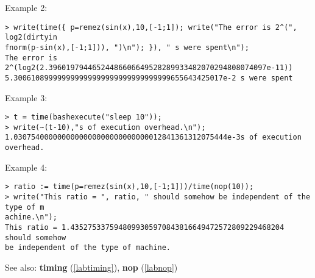 \noindent Example 2: 
\begin{center}\begin{minipage}{15cm}\begin{Verbatim}[frame=single]
> write(time({ p=remez(sin(x),10,[-1;1]); write("The error is 2^(", log2(dirtyin
fnorm(p-sin(x),[-1;1])), ")\n"); }), " s were spent\n");
The error is 2^(log2(2.39601979446524486606649528289933482070294808074097e-11))
5.300610899999999999999999999999999999655643425017e-2 s were spent
\end{Verbatim}
\end{minipage}\end{center}
\noindent Example 3: 
\begin{center}\begin{minipage}{15cm}\begin{Verbatim}[frame=single]
> t = time(bashexecute("sleep 10"));
> write(~(t-10),"s of execution overhead.\n");
1.0307540000000000000000000000000012841361312075444e-3s of execution overhead.
\end{Verbatim}
\end{minipage}\end{center}
\noindent Example 4: 
\begin{center}\begin{minipage}{15cm}\begin{Verbatim}[frame=single]
> ratio := time(p=remez(sin(x),10,[-1;1]))/time(nop(10));
> write("This ratio = ", ratio, " should somehow be independent of the type of m
achine.\n");
This ratio = 1.4352753375948099305970843816649472572809229468204 should somehow 
be independent of the type of machine.
\end{Verbatim}
\end{minipage}\end{center}
See also: \textbf{timing} (\ref{labtiming}), \textbf{nop} (\ref{labnop})
